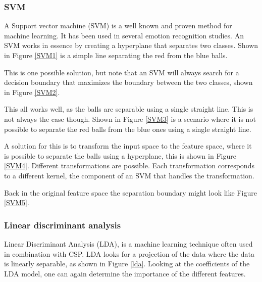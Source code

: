 \clearpage

\subsubsection{SVM}

A Support vector machine (SVM) is a well known and proven method for machine learning. It has been used in several emotion recognition studies. An SVM works in essence by creating a hyperplane that separates two classes. Shown in Figure \ref{SVM1} is a simple line separating the red from the blue balls.


This is one possible solution, but note that an SVM will always search for a decision boundary that maximizes the boundary between the two classes, shown in Figure \ref{SVM2}.


This all works well, as the balls are separable using a single straight line. This is not always the case though. Shown in Figure \ref{SVM3} is a scenario where it is not possible to separate the red balls from the blue ones using a single straight line.


A solution for this is to transform the input space to the feature space, where it is possible to separate the balls using a hyperplane, this is shown in Figure \ref{SVM4}. Different transformations are possible. Each transformation corresponds to a different kernel, the component of an SVM that handles the transformation.


Back in the original feature space the separation boundary might look like Figure \ref{SVM5}.


\subsubsection{Linear discriminant analysis}
Linear Discriminant Analysis (LDA), is a machine learning technique often used in combination with CSP\cite{ErrorPotentials,svmldacomp,currTrends}. LDA looks for a projection of the data where the data is linearly separable, as shown in Figure \ref{lda}. Looking at the coefficients of the LDA model, one can again determine the importance of the different features.

